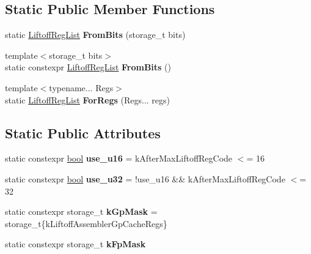 \subsection*{Static Public Member Functions}
\begin{DoxyCompactItemize}
\item 
\mbox{\label{classv8_1_1internal_1_1wasm_1_1LiftoffRegList_a83e46cb768d7bd3b64e2b66e0f15483a}} 
static \mbox{\hyperlink{classv8_1_1internal_1_1wasm_1_1LiftoffRegList}{Liftoff\+Reg\+List}} {\bfseries From\+Bits} (storage\+\_\+t bits)
\item 
\mbox{\label{classv8_1_1internal_1_1wasm_1_1LiftoffRegList_ae1def16345ea2ee88959cd9e5c99d4a1}} 
{\footnotesize template$<$storage\+\_\+t bits$>$ }\\static constexpr \mbox{\hyperlink{classv8_1_1internal_1_1wasm_1_1LiftoffRegList}{Liftoff\+Reg\+List}} {\bfseries From\+Bits} ()
\item 
\mbox{\label{classv8_1_1internal_1_1wasm_1_1LiftoffRegList_aa9bc0917056708fc68c50fc803aa722d}} 
{\footnotesize template$<$typename... Regs$>$ }\\static \mbox{\hyperlink{classv8_1_1internal_1_1wasm_1_1LiftoffRegList}{Liftoff\+Reg\+List}} {\bfseries For\+Regs} (Regs... regs)
\end{DoxyCompactItemize}
\subsection*{Static Public Attributes}
\begin{DoxyCompactItemize}
\item 
\mbox{\label{classv8_1_1internal_1_1wasm_1_1LiftoffRegList_af3ea94fccb0087ad31e82baa6248c6e6}} 
static constexpr \mbox{\hyperlink{classbool}{bool}} {\bfseries use\+\_\+u16} = k\+After\+Max\+Liftoff\+Reg\+Code $<$= 16
\item 
\mbox{\label{classv8_1_1internal_1_1wasm_1_1LiftoffRegList_a795e8f3abdef39b745f3586c4fca6e7a}} 
static constexpr \mbox{\hyperlink{classbool}{bool}} {\bfseries use\+\_\+u32} = !use\+\_\+u16 \&\& k\+After\+Max\+Liftoff\+Reg\+Code $<$= 32
\item 
\mbox{\label{classv8_1_1internal_1_1wasm_1_1LiftoffRegList_ae0d3c068d2800d4b334cd25e917ec3f8}} 
static constexpr storage\+\_\+t {\bfseries k\+Gp\+Mask} = storage\+\_\+t\{k\+Liftoff\+Assembler\+Gp\+Cache\+Regs\}
\item 
static constexpr storage\+\_\+t {\bfseries k\+Fp\+Mask}
\end{DoxyCompactItemize}


